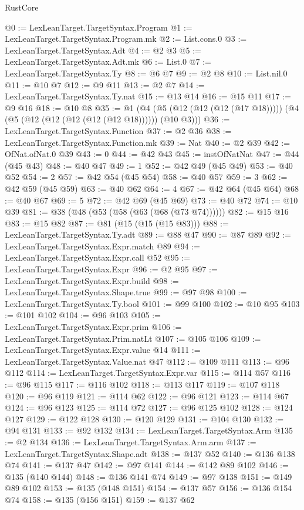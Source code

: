 \begin{lexlean}{RustCore}
\begin{coremodule}
@0 := LexLeanTarget.TargetSyntax.Program
@1 := LexLeanTarget.TargetSyntax.Program.mk
@2 := List.cons.{0}
@3 := LexLeanTarget.TargetSyntax.Adt
@4 := @2 @3
@5 := LexLeanTarget.TargetSyntax.Adt.mk
@6 := List.{0}
@7 := LexLeanTarget.TargetSyntax.Ty
@8 := @6 @7
@9 := @2 @8
@10 := List.nil.{0}
@11 := @10 @7
@12 := @9 @11
@13 := @2 @7
@14 := LexLeanTarget.TargetSyntax.Ty.nat
@15 := @13 @14
@16 := @15 @11
@17 := @9 @16
@18 := @10 @8
@35 := @1 (@4 (@5 (@12 (@12 (@12 (@17 @18))))) (@4 (@5 (@12 (@12 (@12 (@12 (@12 @18)))))) (@10 @3)))
@36 := LexLeanTarget.TargetSyntax.Function
@37 := @2 @36
@38 := LexLeanTarget.TargetSyntax.Function.mk
@39 := Nat
@40 := @2 @39
@42 := OfNat.ofNat.{0} @39
@43 := 0
@44 := @42 @43
@45 := instOfNatNat
@47 := @44 (@45 @43)
@48 := @40 @47
@49 := 1
@52 := @42 @49 (@45 @49)
@53 := @40 @52
@54 := 2
@57 := @42 @54 (@45 @54)
@58 := @40 @57
@59 := 3
@62 := @42 @59 (@45 @59)
@63 := @40 @62
@64 := 4
@67 := @42 @64 (@45 @64)
@68 := @40 @67
@69 := 5
@72 := @42 @69 (@45 @69)
@73 := @40 @72
@74 := @10 @39
@81 := @38 (@48 (@53 (@58 (@63 (@68 (@73 @74))))))
@82 := @15 @16
@83 := @15 @82
@87 := @81 (@15 (@15 (@15 @83)))
@88 := LexLeanTarget.TargetSyntax.Ty.adt
@89 := @88 @47
@90 := @87 @89
@92 := LexLeanTarget.TargetSyntax.Expr.match @89
@94 := LexLeanTarget.TargetSyntax.Expr.call @52
@95 := LexLeanTarget.TargetSyntax.Expr
@96 := @2 @95
@97 := LexLeanTarget.TargetSyntax.Expr.build
@98 := LexLeanTarget.TargetSyntax.Shape.true
@99 := @97 @98
@100 := LexLeanTarget.TargetSyntax.Ty.bool
@101 := @99 @100
@102 := @10 @95
@103 := @101 @102
@104 := @96 @103
@105 := LexLeanTarget.TargetSyntax.Expr.prim
@106 := LexLeanTarget.TargetSyntax.Prim.natLt
@107 := @105 @106
@109 := LexLeanTarget.TargetSyntax.Expr.value @14
@111 := LexLeanTarget.TargetSyntax.Value.nat @47
@112 := @109 @111
@113 := @96 @112
@114 := LexLeanTarget.TargetSyntax.Expr.var
@115 := @114 @57
@116 := @96 @115
@117 := @116 @102
@118 := @113 @117
@119 := @107 @118
@120 := @96 @119
@121 := @114 @62
@122 := @96 @121
@123 := @114 @67
@124 := @96 @123
@125 := @114 @72
@127 := @96 @125 @102
@128 := @124 @127
@129 := @122 @128
@130 := @120 @129
@131 := @104 @130
@132 := @94 @131
@133 := @92 @132
@134 := LexLeanTarget.TargetSyntax.Arm
@135 := @2 @134
@136 := LexLeanTarget.TargetSyntax.Arm.arm
@137 := LexLeanTarget.TargetSyntax.Shape.adt
@138 := @137 @52
@140 := @136 @138 @74
@141 := @137 @47
@142 := @97 @141
@144 := @142 @89 @102
@146 := @135 (@140 @144)
@148 := @136 @141 @74
@149 := @97 @138
@151 := @149 @89 @102
@153 := @135 (@148 @151)
@154 := @137 @57
@156 := @136 @154 @74
@158 := @135 (@156 @151)
@159 := @137 @62

\end{coremodule}
\end{lexlean}
